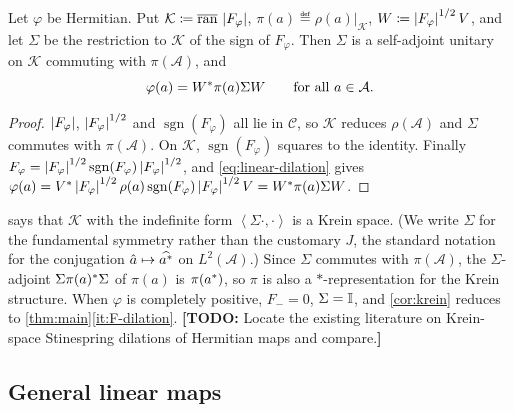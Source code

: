 \documentclass[12pt]{article}
\newcommand{\todo}[1]{\textcolor{\mysubcolor}{\small\textbf{[TODO:} #1\textbf{]}}}
\newcommand{\alg}{\mathcal{A}}             %
\newcommand{\dil}{\mathcal{K}}             %
\newcommand{\ip}[2]{\left\langle #1 , #2 \right\rangle}
\newcommand{\Fphi}{F_{\varphi}}            %
\begin{document}
\begin{corollary}
\label{cor:krein}
Let \(\varphi\) be Hermitian. Put \(\dil \eqdef \overline{\operatorname{ran}}\,\abs{\Fphi}\),
\(\pi(a) \eqdef \rho(a)|_{\dil}\), \(W \eqdef \abs{\Fphi}^{1/2} V\), and let \(\Sigma\) be the
restriction to \(\dil\) of the sign of \(\Fphi\). Then \(\Sigma\) is a self-adjoint
unitary on \(\dil\) commuting with \(\pi(\alg)\), and
\[
  \varphi(a) = W^\adjoint \pi(a) \Sigma W \qquad \text{for all } a \in \alg .
\]
\end{corollary}
\begin{proof}
\(\abs{\Fphi}\), \(\abs{\Fphi}^{1/2}\) and \(\operatorname{sgn}(\Fphi)\) all lie in
\(\mathcal{C}\), so \(\dil\) reduces \(\rho(\alg)\) and \(\Sigma\) commutes with \(\pi(\alg)\).
On \(\dil\), \(\operatorname{sgn}(\Fphi)\) squares to the identity. Finally
\(\Fphi = \abs{\Fphi}^{1/2}\operatorname{sgn}(\Fphi)\abs{\Fphi}^{1/2}\), and
\eqref{eq:linear-dilation} gives
\(\varphi(a) = V^\adjoint \abs{\Fphi}^{1/2} \rho(a) \operatorname{sgn}(\Fphi)
\abs{\Fphi}^{1/2} V = W^\adjoint \pi(a) \Sigma W\).
\end{proof}

\begin{remark}
 says that \(\dil\) with the indefinite form
\(\ip{\Sigma\cdot}{\cdot}\) is a Krein space.
(We write \(\Sigma\) for the fundamental symmetry rather than the customary
\(J\), the standard notation for the conjugation
\(\hat a \mapsto \widehat{a^*}\) on \(L^2(\alg)\).) Since \(\Sigma\) commutes with \(\pi(\alg)\), the
\(\Sigma\)-adjoint \(\Sigma\pi(a)^* \Sigma\) of \(\pi(a)\) is \(\pi(a^*)\), so \(\pi\) is
also a \(*\)-representation for the Krein structure. When \(\varphi\) is completely positive,
\(F_- = 0\), \(\Sigma = {\mathbb I}\), and \cref{cor:krein} reduces to
\cref{thm:main}\ref{it:F-dilation}.
\todo{Locate the existing literature on Krein-space Stinespring dilations of
Hermitian maps and compare.}
\end{remark}

\subsection{General linear maps}
\label{sec:general-linear}
\end{document}
